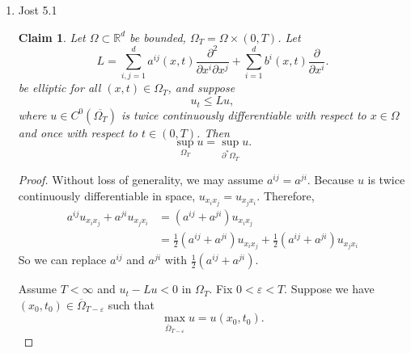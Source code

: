 \documentclass[a4paper]{article}
\newtheorem*{claim}{Claim}
\newcommand{\R}{\mathbb{R}}
\begin{document}
\begin{enumerate}
\begin{proof}
      Let $v = \Lambda(x,y,T+\varepsilon, t) - \mu$ for some $\varepsilon>0$. Then $v_t + \Delta v = 0$, so we can use this $v$ in the above
      calculations.

      As calculated in Jost,
      \[ \Lambda_{x_i} (x,y,t,t_0) = \frac{x^i - y^i}{2(t_0 - t)} \Lambda(x,y,t,t_0) .\]
      Because $M(y,T;\mu)$ is defined as a level set of $\Lambda$, $\nabla \Lambda$ and $\nu_x$ are parallel. Therefore, we have
      \begin{align*}
        \frac{\partial \Lambda}{\partial \nu_x} &= - \frac{|x-y|}{2(T-t)} \Lambda \\
        &= - \frac{|x-y|}{2(T-t)}\mu \quad \parbox{5cm}{because $\Lambda=\mu$ on $\partial M(y,T;\mu)$}
      \end{align*}<++>
    \end{proof}

  \item Jost 5.1
    \begin{claim}
      Let $\Omega \subset \R^d$ be bounded, $\Omega_T = \Omega \times (0,T)$. Let
      \[ L = \sum_{i,j=1}^d a^{ij}(x,t) \frac{\partial^2}{\partial x^i \partial x^j} + \sum_{i=1}^d b^i(x,t) \frac{\partial}{\partial x^i} .\]
      be elliptic for all $(x,t) \in \Omega_T$, and suppose
      \[ u_t \leq Lu, \]
      where $u \in C^0(\overline{\Omega_T})$ is twice continuously differentiable with respect to $x \in \Omega$ and once with respect to $t \in
      (0,T)$. Then
      \[ \sup_{\Omega_T} u = \sup_{\partial^\ast \Omega_T} u. \]
    \end{claim}

    \begin{proof}
      Without loss of generality, we may assume $a^{ij} = a^{ji}$. Because $u$ is twice continuously differentiable in space, $u_{x_i x_j} = u_{x_j
      x_i}$. Therefore,
      \begin{align*}
        a^{ij} u_{x_i x_j} + a^{ji} u_{x_j x_i} &= (a^{ij} + a^{ji}) u_{x_i x_j} \\
        &= \frac{1}{2} (a^{ij} + a^{ji}) u_{x_i x_j} + \frac{1}{2} (a^{ij} + a^{ji}) u_{x_j x_i}
      \end{align*}
      So we can replace $a^{ij}$ and $a^{ji}$ with $\frac{1}{2} (a^{ij} + a^{ji})$.

      Assume $T < \infty$ and $u_t - Lu < 0$ in $\Omega_T$.
      Fix $0<\varepsilon<T$. Suppose we have $(x_0,t_0) \in \overline{\Omega}_{T-\varepsilon}$ such that
      \[ \max_{\overline{\Omega}_{T-\varepsilon}} u = u(x_0,t_0) .\]


\end{proof}
\end{enumerate}
\end{document}
